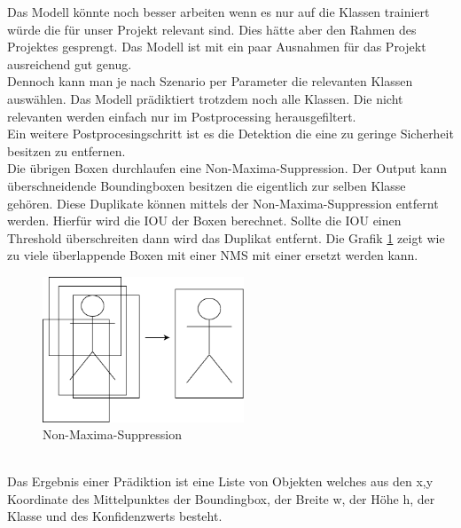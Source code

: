\documentclass[conference]{IEEEtran}
\begin{document}
	Das Modell könnte noch besser arbeiten wenn es nur auf die Klassen trainiert würde die für unser Projekt relevant sind. Dies hätte aber den Rahmen des Projektes gesprengt. Das Modell ist mit ein paar Ausnahmen für das Projekt ausreichend gut genug.\\
	Dennoch kann man je nach Szenario per Parameter die relevanten Klassen auswählen. Das Modell prädiktiert trotzdem noch alle Klassen. Die nicht relevanten werden einfach nur im Postprocessing herausgefiltert.\\
	Ein weitere Postprocesingschritt ist es die Detektion die eine zu geringe Sicherheit besitzen zu entfernen.\\
	Die übrigen Boxen durchlaufen eine Non-Maxima-Suppression.
	Der Output kann überschneidende Boundingboxen besitzen die eigentlich zur selben Klasse gehören. Diese Duplikate können mittels der Non-Maxima-Suppression entfernt werden. Hierfür wird die IOU der Boxen berechnet. Sollte die IOU einen Threshold überschreiten dann wird das Duplikat entfernt. Die Grafik \ref{NMS} zeigt wie zu viele überlappende Boxen mit einer NMS mit einer ersetzt werden kann.\\
	\begin{figure}[!h]
		\begin{center}
			\includegraphics[width=6cm]{Media/NMS.png}
			\caption{Non-Maxima-Suppression}
			\label{NMS}
		\end{center}
	\end{figure}\\
	Das Ergebnis einer Prädiktion ist eine Liste von Objekten welches aus den x,y Koordinate des Mittelpunktes der Boundingbox, der Breite w, der Höhe h, der Klasse und des Konfidenzwerts besteht.
	
\end{document}

